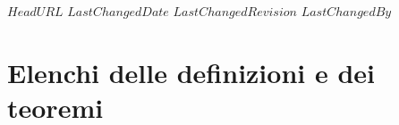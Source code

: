 \svnidlong
{$HeadURL$}
{$LastChangedDate$}
{$LastChangedRevision$}
{$LastChangedBy$}

\chapter{Elenchi delle definizioni e dei teoremi}
\begin{multicols}{2}
	\listofdefines
\end{multicols}
\begin{multicols}{2}
	\listoftheoremas
\end{multicols}
\begin{comment}

\chapter{Elenchi ...}
\labelChapter{elenchi}

\begin{introduction}
‘‘BEEP BOOP INSERIRE CITAZIONE QUA BEEP BOOP.''
\begin{flushright}
	\textsc{NON UN ROBOT,} UN UMANO IN CARNE ED OSSA BEEP BOOP.
\end{flushright}
\end{introduction}
\end{comment}
